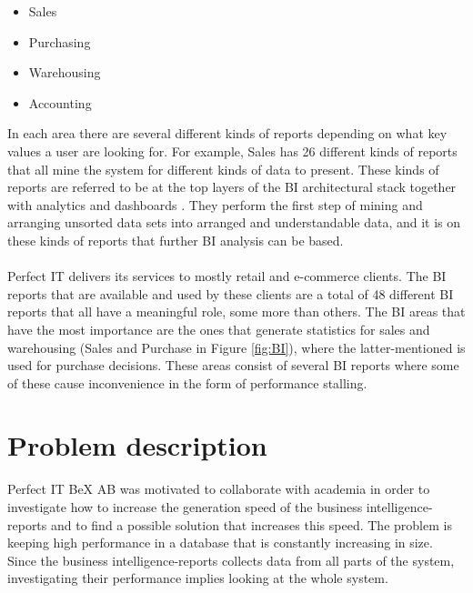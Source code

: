 \documentclass{cslthse-msc}
\begin{document}
\begin{itemize}
\item Sales
\item Purchasing
\item Warehousing
\item Accounting
\end{itemize}

In each area there are several different kinds of reports depending on what key values a user are looking for. For example, Sales has 26 different kinds of reports that all mine the system for different kinds of data to present. These kinds of reports are referred to be at the top layers of the BI architectural stack together with analytics and dashboards \cite{Evelson10}. They perform the first step of mining and arranging unsorted data sets into arranged and understandable data, and it is on these kinds of reports that further BI analysis can be based.\\\\
Perfect IT delivers its services to mostly retail and e-commerce clients. The BI reports that are available and used by these clients are a total of 48 different BI reports that all have a meaningful role, some more than others. The BI areas that have the most importance are the ones that generate statistics for sales and warehousing (Sales and Purchase in Figure \ref{fig:BI}), where the latter-mentioned is used for purchase decisions. These areas consist of several BI reports where some of these cause inconvenience in the form of performance stalling. 

\section{Problem description}
Perfect IT BeX AB was motivated to collaborate with academia in order to investigate how to increase the generation speed of the business intelligence-reports and to find a possible solution that increases this speed. The problem is keeping high performance in a database that is constantly increasing in size. Since the business intelligence-reports collects data from all parts of the system, investigating their performance implies looking at the whole system.
\end{document}
